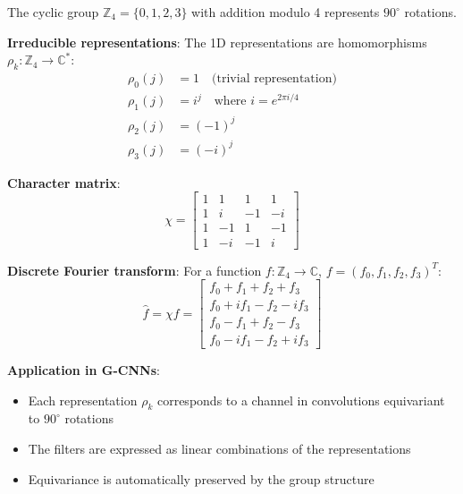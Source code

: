 \begin{example}\label{ex:grupo_z4_detallado}
The cyclic group $\mathbb{Z}_4 = \{0, 1, 2, 3\}$ with addition modulo 4 represents $90^\circ$ rotations.

\textbf{Irreducible representations}:
The 1D representations are homomorphisms $\rho_k: \mathbb{Z}_4 \to \mathbb{C}^*$:
\begin{align}
\rho_0(j) &= 1 \quad \text{(trivial representation)} \\
\rho_1(j) &= i^j \quad \text{where } i = e^{2\pi i/4} \\
\rho_2(j) &= (-1)^j \\
\rho_3(j) &= (-i)^j
\end{align}

\textbf{Character matrix}:
\begin{equation}
\chi = \begin{bmatrix}
1 & 1 & 1 & 1 \\
1 & i & -1 & -i \\
1 & -1 & 1 & -1 \\
1 & -i & -1 & i
\end{bmatrix}
\end{equation}

\textbf{Discrete Fourier transform}:
For a function $f: \mathbb{Z}_4 \to \mathbb{C}$, $f = (f_0, f_1, f_2, f_3)^T$:
\begin{equation}
\hat{f} = \chi f = \begin{bmatrix}
f_0 + f_1 + f_2 + f_3 \\
f_0 + if_1 - f_2 - if_3 \\
f_0 - f_1 + f_2 - f_3 \\
f_0 - if_1 - f_2 + if_3
\end{bmatrix}
\end{equation}

\textbf{Application in G-CNNs}:
\begin{itemize}
    \item Each representation $\rho_k$ corresponds to a channel in convolutions equivariant to $90^\circ$ rotations
    \item The filters are expressed as linear combinations of the representations
    \item Equivariance is automatically preserved by the group structure
\end{itemize}
\end{example}


